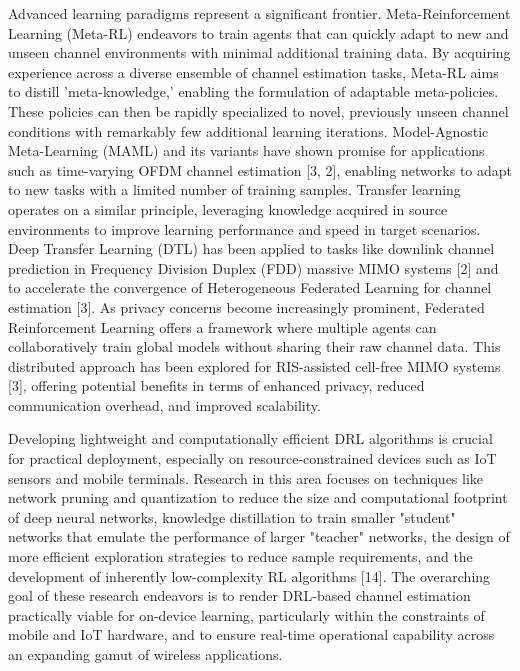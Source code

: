 \documentclass[journal,twocolumn]{IEEEtran}
\begin{document}
Advanced learning paradigms represent a significant frontier. Meta-Reinforcement Learning (Meta-RL) endeavors to train agents that can quickly adapt to new and unseen channel environments with minimal additional training data. By acquiring experience across a diverse ensemble of channel estimation tasks, Meta-RL aims to distill 'meta-knowledge,' enabling the formulation of adaptable meta-policies. These policies can then be rapidly specialized to novel, previously unseen channel conditions with remarkably few additional learning iterations. Model-Agnostic Meta-Learning (MAML) and its variants have shown promise for applications such as time-varying OFDM channel estimation [3, 2], enabling networks to adapt to new tasks with a limited number of training samples. Transfer learning operates on a similar principle, leveraging knowledge acquired in source environments to improve learning performance and speed in target scenarios. Deep Transfer Learning (DTL) has been applied to tasks like downlink channel prediction in Frequency Division Duplex (FDD) massive MIMO systems [2] and to accelerate the convergence of Heterogeneous Federated Learning for channel estimation [3]. As privacy concerns become increasingly prominent, Federated Reinforcement Learning offers a framework where multiple agents can collaboratively train global models without sharing their raw channel data. This distributed approach has been explored for RIS-assisted cell-free MIMO systems [3], offering potential benefits in terms of enhanced privacy, reduced communication overhead, and improved scalability.

Developing lightweight and computationally efficient DRL algorithms is crucial for practical deployment, especially on resource-constrained devices such as IoT sensors and mobile terminals. Research in this area focuses on techniques like network pruning and quantization to reduce the size and computational footprint of deep neural networks, knowledge distillation to train smaller "student" networks that emulate the performance of larger "teacher" networks, the design of more efficient exploration strategies to reduce sample requirements, and the development of inherently low-complexity RL algorithms [14]. The overarching goal of these research endeavors is to render DRL-based channel estimation practically viable for on-device learning, particularly within the constraints of mobile and IoT hardware, and to ensure real-time operational capability across an expanding gamut of wireless applications.
\end{document}
